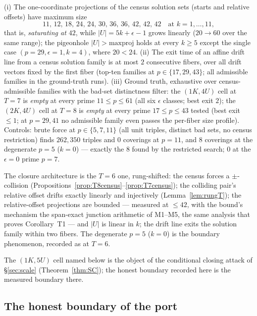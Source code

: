 \begin{proposition}
\label{prop:shearT78}
\textup{(i)} The one-coordinate projections of the census solution sets
(starts and relative offsets) have maximum size
\[
11,\,12,\,18,\,24,\,24,\,30,\,36,\,36,\,42,\,42,\,42
\quad\text{at }k=1,\dots,11,
\]
that is, \emph{saturating at $42$}, while
$|U|=5k+\epsilon-1$ grows linearly ($20\to60$ over the same range); the
pigeonhole $|U|>\text{maxproj}$ holds at every $k\ge5$ except the single
case $(p{=}29,\epsilon{=}1,k{=}4)$, where $20<24$. \textup{(ii)} The
exit time of an affine drift line from a census solution family is at
most $2$ consecutive fibers, over all drift vectors fixed by the first
fiber (top-ten families at $p\in\{17,29,43\}$; all admissible families
in the ground-truth runs). \textup{(iii)} Ground truth, exhaustive over
census-admissible families with the bad-set distinctness filter: the
$(1K,4U)$ cell at $T=7$ is \emph{empty} at every prime
$11\le p\le61$ (all six $\epsilon$ classes; best exit $2$); the
$(2K,4U)$ cell at $T=8$ is \emph{empty} at every prime $17\le p\le43$
tested (best exit $\le1$; at $p=29,41$ no admissible family even passes
the per-fiber size profile). Controls: brute force at $p\in\{5,7,11\}$
(all unit triples, distinct bad sets, no census restriction) finds
$262{,}350$ triples and $0$ coverings at $p=11$, and $8$ coverings at
the degenerate $p=5$ ($k=0$) --- exactly the $8$ found by the
restricted search; $0$ at the $\epsilon=0$ prime $p=7$.
\end{proposition}

The closure architecture is the $T=6$ one, rung-shifted: the census
forces a $\pm$-collision (Propositions~\ref{prop:T8census}--\ref{prop:T7census});
the colliding pair's relative offset drifts exactly linearly and
injectively (Lemma~\ref{lem:rungT}); the relative-offset projections are
bounded --- measured at $\le42$, with the bound's mechanism the
span-exact junction arithmetic of M1--M5, the same analysis that proves
Corollary~T1 --- and $|U|$ is linear in $k$; the drift line exits the
solution family within two fibers. The degenerate $p=5$ ($k=0$) is the
boundary phenomenon, recorded as at $T=6$.

The $(1K,5U)$ cell named below is the object of the conditional
closing attack of \S\ref{sec:scale} (Theorem~\ref{thm:SC}); the honest
boundary recorded here is the measured boundary there.

\subsection{The honest boundary of the port}


